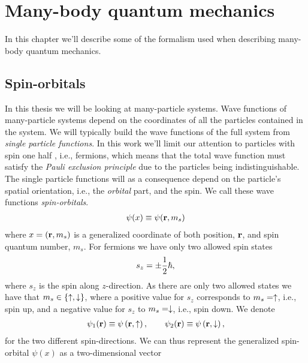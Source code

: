 \chapter{Many-body quantum mechanics}
    In this chapter we'll describe some of the formalism used when describing
    many-body quantum mechanics.

    \section{Spin-orbitals}
        In this thesis we will be looking at many-particle systems.
        Wave functions of many-particle systems depend on the coordinates of all
        the particles contained in the system.
        We will typically build the wave functions of the full system from
        \emph{single particle functions}.
        In this work we'll limit our attention to particles with spin one half ,
        i.e., fermions, which means that the total wave function must satisfy
        the \emph{Pauli exclusion principle} due to the particles being
        indistinguishable.
        The single particle functions will as a consequence depend on the
        particle's spatial orientation, i.e., the \emph{orbital} part, and the
        spin.
        We call these wave functions \emph{spin-orbitals}.
        \begin{align}
            \psi(x) \equiv \psi(\mathbf{r}, m_s)
        \end{align}
        where $x = (\mathbf{r}, m_s)$ is a generalized coordinate of both
        position, $\mathbf{r}$, and spin quantum number, $m_s$.
        For fermions we have only two allowed spin states
        \begin{align}
            s_z = \pm \frac{1}{2}\hslash,
        \end{align}
        where $s_z$ is the spin along $z$-direction.
        As there are only two allowed states we have that $m_s \in
        \left\{ \uparrow, \downarrow \right\}$, where a positive value for $s_z$ corresponds
        to $m_s = \uparrow$, i.e., spin up, and a negative value for $s_z$ to
        $m_s = \downarrow$, i.e., spin down.
        We denote
        \begin{align}
            \psi_1(\mathbf{r}) \equiv \psi\left( \mathbf{r}, \uparrow \right),
            \qquad
            \psi_2(\mathbf{r}) \equiv \psi\left( \mathbf{r}, \downarrow \right),
        \end{align}
        for the two different spin-directions.
        We can thus represent the generalized spin-orbital $\psi(x)$ as a
        two-dimensional vector
